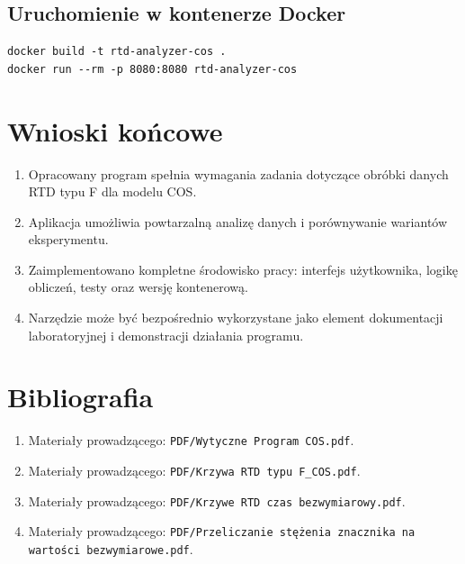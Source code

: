 \documentclass[12pt,a4paper]{article}
\begin{document}
\subsection{Uruchomienie w kontenerze Docker}
\begin{verbatim}
docker build -t rtd-analyzer-cos .
docker run --rm -p 8080:8080 rtd-analyzer-cos
\end{verbatim}

\section{Wnioski końcowe}
\begin{enumerate}
    \item Opracowany program spełnia wymagania zadania dotyczące obróbki danych RTD typu F dla modelu COS.
    \item Aplikacja umożliwia powtarzalną analizę danych i porównywanie wariantów eksperymentu.
    \item Zaimplementowano kompletne środowisko pracy: interfejs użytkownika, logikę obliczeń, testy oraz wersję kontenerową.
    \item Narzędzie może być bezpośrednio wykorzystane jako element dokumentacji laboratoryjnej i demonstracji działania programu.
\end{enumerate}

\section*{Bibliografia}
\begin{enumerate}
    \item Materiały prowadzącego: \texttt{PDF/Wytyczne Program COS.pdf}.
    \item Materiały prowadzącego: \texttt{PDF/Krzywa RTD typu F\_COS.pdf}.
    \item Materiały prowadzącego: \texttt{PDF/Krzywe RTD czas bezwymiarowy.pdf}.
    \item Materiały prowadzącego: \texttt{PDF/Przeliczanie stężenia znacznika na wartości bezwymiarowe.pdf}.
\end{enumerate}
\end{document}
